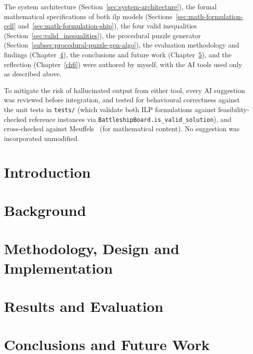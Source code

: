 The system architecture (Section~\ref{sec:system-architecture}), the formal mathematical specifications of both \gls{ilp} models (Sections~\ref{sec:math-formulation-cell} and~\ref{sec:math-formulation-ship}), the four valid inequalities (Section~\ref{sec:valid_inequalities}), the procedural puzzle generator (Section~\ref{subsec:procedural-puzzle-gen-algo}), the evaluation methodology and findings (Chapter~\ref{ch4}), the conclusions and future work (Chapter~\ref{ch5}), and the reflection (Chapter~\ref{ch6}) were authored by myself, with the AI tools used only as described above.

To mitigate the risk of hallucinated output from either tool, every AI suggestion was reviewed before integration, and tested for behavioural correctness against the unit tests in \verb|tests/| (which validate both ILP formulations against feasibility-checked reference instances via \verb|BattleshipBoard.is_valid_solution|), and cross-checked against Meuffels~\citep{meuffels-battleship} (for mathematical content). No suggestion was incorporated unmodified.

\mainmatter

\chapter{Introduction}\label{ch1}


\chapter{Background}\label{ch2}


\chapter{Methodology, Design and Implementation}\label{ch3}


\chapter{Results and Evaluation}\label{ch4}


\chapter{Conclusions and Future Work}\label{ch5}


